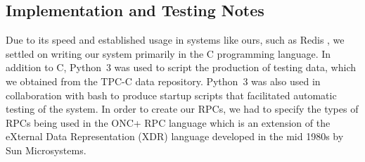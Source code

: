 \subsection{Implementation and Testing Notes}
Due to its speed and established usage in systems like ours, such as Redis
\cite{redis}, we settled on writing our system primarily in the C programming
language. In addition to C, Python~3 was used to script the production of
testing data, which we obtained from the TPC-C data repository. Python~3 was
also used in collaboration with bash to produce startup scripts that
facilitated automatic testing of the system. In order to create our RPCs, we
had to specify the types of RPCs being used in the ONC+ RPC language which is
an extension of the eXternal Data Representation (XDR) language developed in
the mid 1980s by Sun Microsystems.
